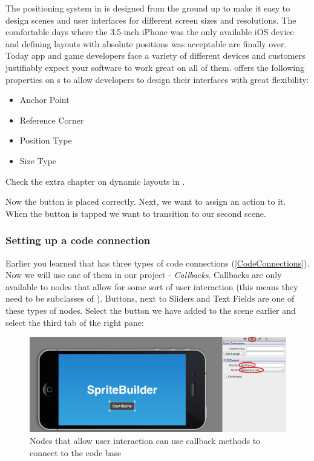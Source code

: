 \begin{details}[frametitle={Positioning System in \cocos{} and \SB{}}]
 \label{PositioningSystem}
The positioning system in \cocos{} is designed from the ground up to make it
easy to design scenes and user interfaces for different screen sizes and
resolutions. The comfortable days where the 3.5-inch iPhone was the only 
available iOS device and defining layouts with absolute positions was acceptable
are finally over. Today app and game developers face a variety of different
devices and customers justifiably expect your software to work great on all of
them. \cocos{} offers the following properties on \ccnode{}s to allow developers
to design their interfaces with great flexibility:

\begin{itemize}
  \item Anchor Point
  \item Reference Corner
  \item Position Type
  \item Size Type
\end{itemize}

Check the extra chapter on dynamic layouts in \SB{}. %

\end{details}

Now the button is placed correctly. Next, we want to assign an action to it.
When the button is tapped we want to transition to our second scene.

\subsubsection{Setting up a code connection}

Earlier you learned that \SB{} has three types of code connections 
(\ref{CodeConnections}). Now we will use one of them in our project -
\textit{Callbacks}. Callbacks are only
available to nodes that allow for some sort of user interaction (this means they need to be subclasses of
). Buttons, next to Sliders and Text Fields are one of
these types of nodes. Select the button we have added to the scene earlier and
select the third tab of the right pane:

\begin{figure}[H]
		\centering
		\includegraphics[width=0.9\linewidth]{images/firstproject/button_callback.png}
		\caption{Nodes that allow user interaction can use callback methods to
		connect to the code base}
\end{figure}

